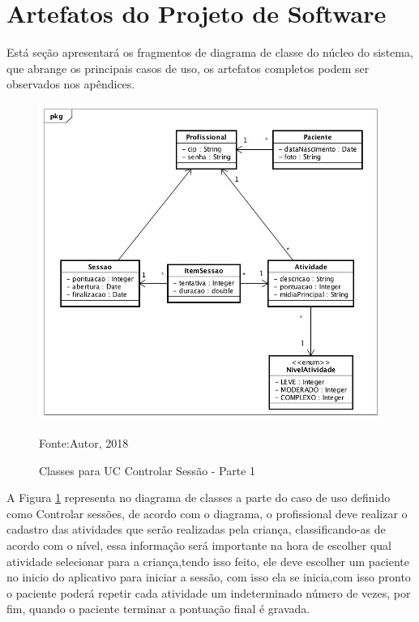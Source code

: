 \section{Artefatos do Projeto de Software}
Está seção apresentará os fragmentos de diagrama de classe do núcleo do sistema, que abrange os principais casos de uso, os artefatos completos podem ser observados nos apêndices.
\begin{figure}[H]
	\centering
	\includegraphics[scale=0.5]{img/UC_ControlarSessao1.jpg}
	\caption{Classes para UC Controlar Sessão - Parte 1}
	\label{pt1UC1}
	Fonte:Autor, 2018
\end{figure}
A Figura \ref{pt1UC1} representa no diagrama de classes a parte do caso de uso definido como Controlar sessões, de acordo com  o diagrama, o profissional deve realizar o cadastro das atividades que serão realizadas pela criança, classificando-as de acordo com o nível, essa informação será importante na hora de escolher qual atividade selecionar para a criança,tendo isso feito, ele deve escolher um paciente no inicio do aplicativo para iniciar a sessão, com isso ela se inicia,com isso pronto o paciente poderá repetir cada atividade um indeterminado número de vezes, por fim, quando o paciente terminar a pontuação final é gravada.

